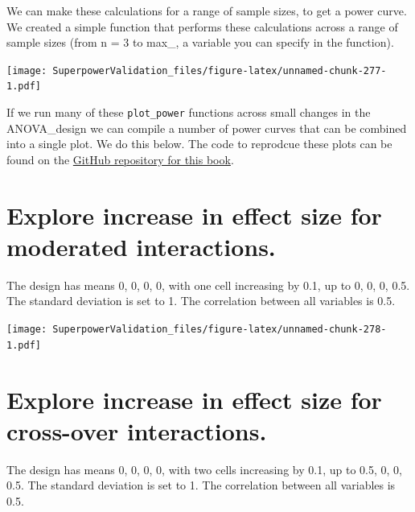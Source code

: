 \documentclass[
]{book}
\newenvironment{Shaded}{\begin{snugshade}}{\end{snugshade}}
\newcommand{\DataTypeTok}[1]{\textcolor[rgb]{0.13,0.29,0.53}{#1}}
\newcommand{\DecValTok}[1]{\textcolor[rgb]{0.00,0.00,0.81}{#1}}
\newcommand{\KeywordTok}[1]{\textcolor[rgb]{0.13,0.29,0.53}{\textbf{#1}}}
\newcommand{\NormalTok}[1]{#1}
\newcommand{\OperatorTok}[1]{\textcolor[rgb]{0.81,0.36,0.00}{\textbf{#1}}}
\newcommand{\StringTok}[1]{\textcolor[rgb]{0.31,0.60,0.02}{#1}}
\begin{document}
We can make these calculations for a range of sample sizes, to get a power curve. We created a simple function that performs these calculations across a range of sample sizes (from n = 3 to max\_, a variable you can specify in the function).

\begin{Shaded}
\end{Shaded}

\texttt{[image: SuperpowerValidation\_files/figure-latex/unnamed-chunk-277-1.pdf]}

If we run many of these \texttt{plot\_power} functions across small changes in the ANOVA\_design we can compile a number of power curves that can be combined into a single plot. We do this below. The code to reprodcue these plots can be found on the \href{https://github.com/arcaldwell49/SuperpowerBook/tree/master/data}{GitHub repository for this book}.
\pagebreak

\hypertarget{explore-increase-in-effect-size-for-moderated-interactions.}{%
\section{Explore increase in effect size for moderated interactions.}\label{explore-increase-in-effect-size-for-moderated-interactions.}}

The design has means 0, 0, 0, 0, with one cell increasing by 0.1, up to 0, 0, 0, 0.5. The standard deviation is set to 1. The correlation between all variables is 0.5.

\texttt{[image: SuperpowerValidation\_files/figure-latex/unnamed-chunk-278-1.pdf]}
\pagebreak

\hypertarget{explore-increase-in-effect-size-for-cross-over-interactions.}{%
\section{Explore increase in effect size for cross-over interactions.}\label{explore-increase-in-effect-size-for-cross-over-interactions.}}

The design has means 0, 0, 0, 0, with two cells increasing by 0.1, up to 0.5, 0, 0, 0.5. The standard deviation is set to 1. The correlation between all variables is 0.5.
\end{document}
